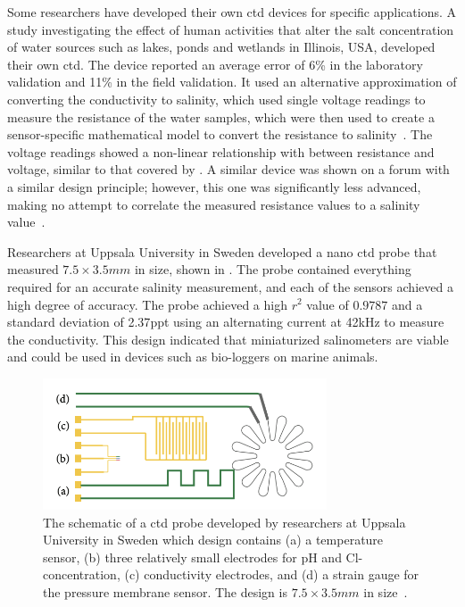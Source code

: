 Some researchers have developed their own \gls{ctd} devices for specific applications.
A study investigating the effect of human activities that alter the salt concentration of water sources such as lakes, ponds and wetlands in Illinois, USA, developed their own \gls{ctd}.
The device reported an average error of 6\% in the laboratory validation and 11\% in the field validation.
It used an alternative approximation of converting the conductivity to salinity, which used single voltage readings to measure the resistance of the water samples, which were then used to create a sensor-specific mathematical model to convert the resistance to salinity~\cite{benjankar_ec_based_salt_measurement_2021}.
The voltage readings showed a non-linear relationship with between resistance and voltage, similar to that covered by .
A similar device was shown on a forum with a similar design principle; however, this one was significantly less advanced, making no attempt to correlate the measured resistance values to a salinity value~\cite{instructables_water_salinity_meter}.

Researchers at Uppsala University in Sweden developed a nano \gls{ctd} probe that measured $7.5 \times 3.5mm$ in size, shown in .
The probe contained everything required for an accurate salinity measurement, and each of the sensors achieved a high degree of accuracy.
The probe achieved a high $r^2$ value of $0.9787$ and a standard deviation of 2.37\gls{ppt} using an alternating current at 42kHz to measure the conductivity.
This design indicated that miniaturized salinometers are viable and could be used in devices such as bio-loggers on marine animals.~\cite{jonsson_chip_based_salinity_2013}
\begin{figure}[ht]
    \centering
    \includegraphics[width=0.75\textwidth]{Figures/nano_ctd}
    \caption{The schematic of a \gls{ctd} probe developed by researchers at Uppsala University in Sweden which design contains (a) a temperature sensor, (b) three relatively small electrodes for pH and Cl- concentration, (c) conductivity electrodes, and (d) a strain gauge for the pressure membrane sensor. The design is $7.5 \times 3.5 mm$ in size~\cite{jonsson_chip_based_salinity_2013}.}
    \label{fig:nano-ctd} %
\end{figure}

